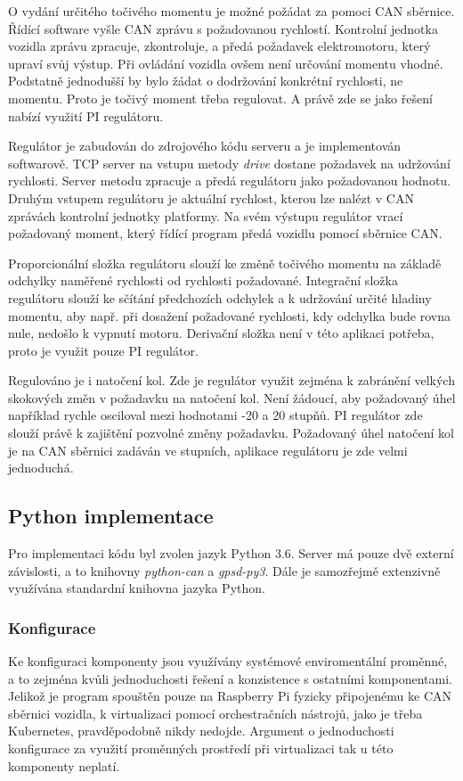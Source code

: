 \documentclass[czech,bachelor,dept460,male,cpp,cpdeclaration]{diploma}
\begin{document}
O vydání určitého točivého momentu je možné požádat za pomoci CAN sběrnice. Řídící software vyšle CAN zprávu s požadovanou
rychlostí. Kontrolní jednotka vozidla zprávu zpracuje, zkontroluje, a předá požadavek elektromotoru, který upraví svůj výstup.
Při ovládání vozidla ovšem není určování momentu vhodné. Podstatně jednodušší by bylo žádat o dodržování konkrétní rychlosti, 
ne momentu. Proto je točivý moment třeba regulovat. A právě zde se jako řešení nabízí využití PI regulátoru.

Regulátor je zabudován do zdrojového kódu serveru a je implementován softwarově. TCP server na vstupu metody \emph{drive} dostane
požadavek na udržování rychlosti. Server metodu zpracuje a předá regulátoru jako požadovanou hodnotu. Druhým vstupem regulátoru
je aktuální rychlost, kterou lze nalézt v CAN zprávách kontrolní jednotky platformy. Na svém výstupu regulátor vrací požadovaný
moment, který řídící program předá vozidlu pomocí sběrnice CAN.

Proporcionální složka regulátoru slouží ke změně točivého momentu na základě odchylky naměřené rychlosti od rychlosti požadované.
Integrační složka regulátoru slouží ke sčítání předchozích odchylek a k udržování určité hladiny momentu, aby např. při dosažení
požadované rychlosti, kdy odchylka bude rovna nule, nedošlo k vypnutí motoru. Derivační složka není v této aplikaci potřeba, proto
je využit pouze PI regulátor.

Regulováno je i natočení kol. Zde je regulátor využit zejména k zabránění velkých skokových změn v požadavku na natočení kol. Není
žádoucí, aby požadovaný úhel například rychle osciloval mezi hodnotami -20 a 20 stupňů. PI regulátor zde slouží právě k zajištění 
pozvolné změny požadavku. Požadovaný úhel natočení kol je na CAN sběrnici zadáván ve stupních, aplikace regulátoru je zde velmi 
jednoduchá.

\subsection{Python implementace}

Pro implementaci kódu byl zvolen jazyk Python 3.6. Server má pouze dvě externí závislosti, a to knihovny \emph{python-can} a
\emph{gpsd-py3}. Dále je samozřejmě extenzivně využívána standardní knihovna jazyka Python.

\subsubsection{Konfigurace}
Ke konfiguraci komponenty jsou využívány systémové enviromentální proměnné, a to zejména kvůli jednoduchosti řešení a konzistence 
s ostatními komponentami. Jelikož je program spouštěn pouze na Raspberry Pi fyzicky připojenému ke CAN sběrnici vozidla,
k virtualizaci pomocí orchestračních nástrojů, jako je třeba Kubernetes, pravděpodobně nikdy nedojde. Argument o jednoduchosti
konfigurace za využití proměnných prostředí při virtualizaci tak u této komponenty neplatí.
\end{document}
